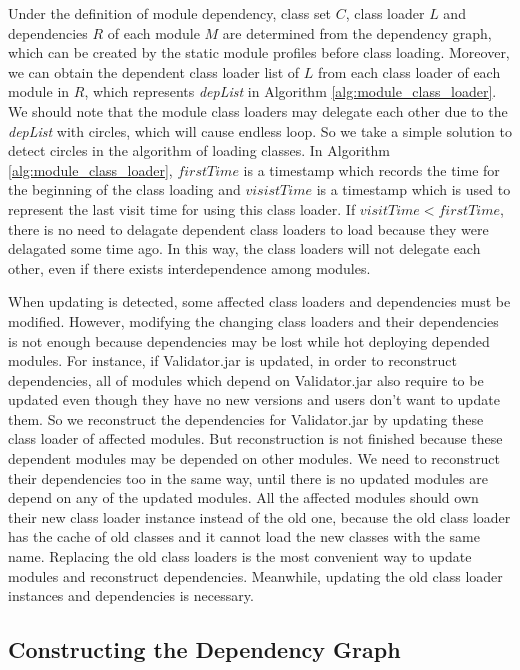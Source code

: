 \documentclass[conference]{IEEEtran}
\begin{document}
Under the definition of module dependency, class set $C$, class loader $L$ and dependencies $R$ of each module $M$ are determined from the dependency graph, which can be created by the static module profiles before class loading.
Moreover, we can obtain the dependent class loader list of $L$ from each class loader of each module in $R$, which represents \emph{depList} in Algorithm \ref{alg:module_class_loader}. 
We should note that the module class loaders may delegate each other due to the \emph{depList} with circles, which will cause endless loop.
So we take a simple solution to detect circles in the algorithm of loading classes.
In Algorithm \ref{alg:module_class_loader}, $firstTime$ is a timestamp which records the time for the beginning of the class loading and $visistTime$ is a timestamp which is used to represent the last visit time for using this class loader. 
If $visitTime < firstTime$, there is no need to delagate dependent class loaders to load because they were delagated some time ago.
In this way, the class loaders will not delegate each other, even if there exists interdependence among modules.

When updating is detected, some affected class loaders and dependencies must be modified.
However, modifying the changing class loaders and their dependencies is not enough because dependencies may be lost while hot deploying depended modules.
For instance, if Validator.jar is updated, in order to reconstruct dependencies, all of modules which depend on Validator.jar also require to be updated even though they have no new versions and users don't want to update them.
So we reconstruct the dependencies for Validator.jar by updating these class loader of affected modules.
But reconstruction is not finished because these dependent modules may be depended on other modules.
We need to reconstruct their dependencies too in the same way, until there is no updated modules are depend on any of the updated modules.
All the affected modules should own their new class loader instance instead of the old one, because the old class loader has the cache of old classes and it cannot load the new classes with the same name.
Replacing the old class loaders is the most convenient way to update modules and reconstruct dependencies.
Meanwhile, updating the old class loader instances and dependencies is necessary.



\subsection{Constructing the Dependency Graph}
\end{document}
